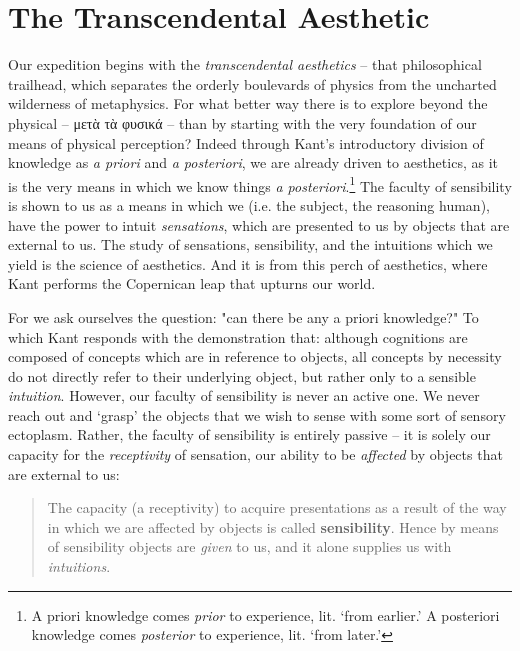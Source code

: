 \section*{The Transcendental Aesthetic}
Our expedition begins with the \emph{transcendental aesthetics} -- that philosophical trailhead, which separates the orderly boulevards of physics from the uncharted wilderness of metaphysics. For what better way there is to explore beyond the physical -- μετὰ τὰ φυσικά -- than by starting with the very foundation of our means of physical perception? Indeed through Kant's introductory division of knowledge as \emph{a priori} and \emph{a posteriori}, we are already driven to aesthetics, as it is the very means in which we know things \emph{a posteriori}.\footnote{A priori knowledge comes \emph{prior} to experience, lit. `from earlier.' A posteriori knowledge comes \emph{posterior} to experience, lit. `from later.'} The faculty of sensibility is shown to us as a means in which we (i.e. the subject, the reasoning human), have the power to intuit \emph{sensations}, which are presented to us by objects that are external to us. The study of sensations, sensibility, and the intuitions which we yield is the science of aesthetics. And it is from this perch of aesthetics, where Kant performs the Copernican leap that upturns our world.

For we ask ourselves the question: "can there be any a priori knowledge?" To which Kant responds with the demonstration that: although cognitions are composed of concepts which are in reference to objects, all concepts by necessity do not directly refer to their underlying object, but rather only to a sensible \emph{intuition}. However, our faculty of sensibility is never an active one. We never reach out and `grasp' the objects that we wish to sense with some sort of sensory ectoplasm. Rather, the faculty of sensibility is entirely passive -- it is solely our capacity for the \emph{receptivity} of sensation, our ability to be \emph{affected} by objects that are external to us:

\begin{quote}
The capacity (a receptivity) to acquire presentations as a result of the way in which we are affected by objects is called \textbf{sensibility}. Hence by means of sensibility objects are \emph{given} to us, and it alone supplies us with \emph{intuitions}.

\autocite[B33]{hackett}
\end{quote}


